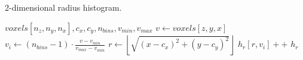 

\begin{algorithm}
    \caption{2-dimensional radius histogram.}
    \label{alg:2dhists}
    \begin{algorithmic}
         {$voxels[n_z,n_y,n_x],c_x,c_y,n_{bins},v_{min},v_{max}$}
                \State $v \gets voxels[z,y,x]$
                    \State $v_{i} \gets (n_{bins}-1) \cdot \frac{v - v_{min}}{v_{max} - v_{min}}$
                    \State $r \gets \left\lfloor\sqrt{(x-c_x)^2 + (y-c_y)^2}\right\rfloor$
                    \State $h_r[r,v_{i}]{+}{+}$
                \EndIf
            \EndFor
            \Return $h_r$
        \EndFunction
    \end{algorithmic}
\end{algorithm}

